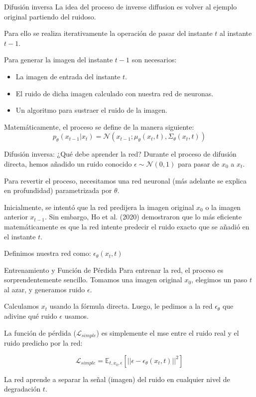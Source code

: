 \begin{frame}{Difusión inversa}
La idea del proceso de inverse diffusion es volver al \alert{ejemplo original} partiendo del \alert{ruidoso}. 

Para ello se realiza \alert{iterativamente} la operación de pasar del instante \alert{$t$} al instante \alert{$t-1$}.

Para generar la imagen del instante \alert{$t-1$} son necesarios:
\begin{itemize}
    \item La \alert{imagen de entrada} del instante \alert{$t$}.
    \item El \alert{ruido} de dicha imagen calculado con nuestra red de neuronas.
    \item Un algoritmo para \alert{sustraer} el ruido de la imagen.
\end{itemize}

Matemáticamente, el proceso se define de la manera siguiente:
\begin{equation}
p_\theta(x_{t-1} \vert{} x_t) = \mathcal{N}(x_{t-1}; \mu_\theta(x_t, t), \Sigma_\theta(x_t, t))
\end{equation}
\end{frame}

\begin{frame}{Difusión inversa: ¿Qué debe aprender la red?}
Durante el proceso de difusión directa, hemos añadido un ruido conocido $\epsilon \sim \mathcal{N}(0,1)$ para pasar de $x_0$ a $x_t$.

Para revertir el proceso, necesitamos una \alert{red neuronal} (más adelante se explica en profundidad) parametrizada por $\theta$. 

Inicialmente, se intentó que la red predijera la imagen original $x_0$ o la imagen anterior $x_{t-1}$. Sin embargo, Ho et al. (2020) \cite{ho2020denoising} demostraron que lo más eficiente matemáticamente es que la red intente \alert{predecir el ruido exacto} que se añadió en el instante $t$.

Definimos nuestra red como: \alert{$\epsilon_\theta(x_t, t)$}
\end{frame}

\begin{frame}{Entrenamiento y Función de Pérdida}
Para entrenar la red, el proceso es sorprendentemente sencillo. Tomamos una imagen original $x_0$, elegimos un paso $t$ al azar, y generamos ruido $\epsilon$.

Calculamos $x_t$ usando la fórmula directa. Luego, le pedimos a la red $\epsilon_\theta$ que adivine qué ruido $\epsilon$ usamos.

La \alert{función de pérdida} ($\mathcal{L}_{simple}$) es simplemente el \alert{\gls{mse}} entre el ruido real y el ruido predicho por la red:

\begin{equation}
    \mathcal{L}_{simple} = \mathbb{E}_{t, x_0, \epsilon} \left[ || \epsilon - \epsilon_\theta(x_t, t) ||^2 \right]
\end{equation}

La red aprende a \alert{separar} la señal (imagen) del ruido en cualquier nivel de degradación $t$.
\end{frame}

